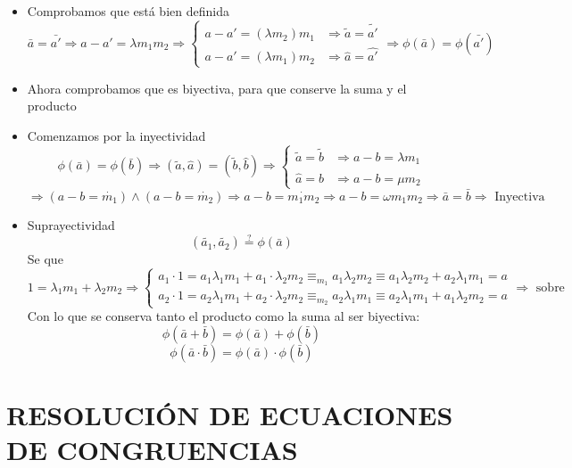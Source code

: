 \documentclass[10pt,a4paper,openright]{book}
\theoremstyle{break}
\begin{document}
\begin{itemize}
\item Comprobamos que está bien definida
$$\bar{a}=\bar{a'}\Rightarrow a-a'=\lambda m_1m_2\Rightarrow
\begin{cases}
a-a'=(\lambda m_2)m_1 & \Rightarrow \tilde{a}=\tilde{a'} \\
a-a'=(\lambda m_1)m_2 & \Rightarrow \hat{a}=\hat{a'}
\end{cases}
\Rightarrow \phi(\bar{a})=\phi(\bar{a'})
$$

\item Ahora comprobamos que es biyectiva, para que conserve la suma y el producto
\item Comenzamos por la inyectividad
$$\phi(\bar{a})=\phi(\bar{b})\Rightarrow (\tilde{a}, \hat{a})=(\tilde{b}, \hat{b})\Rightarrow
\begin{cases}
\tilde{a}=\tilde{b} & \Rightarrow a-b=\lambda m_1 \\
\hat{a}=\hat{b} & \Rightarrow a-b=\mu m_2
\end{cases}
$$
$$
\Rightarrow (a-b=\dot{m_1})\wedge (a-b=\dot{m_2})\Rightarrow a-b=\dot{m_1m_2} \Rightarrow a-b=\omega m_1 m_2 \Rightarrow \bar{a}=\bar{b}\Rightarrow \mbox{ Inyectiva}
$$
\item Suprayectividad
$$(\tilde{a_1},\tilde{a_2})\stackrel{?}{=}\phi(\bar{a})$$
Se que $$1=\lambda_1 m_1+\lambda_2 m_2 \Rightarrow
\begin{cases}
a_1\cdot 1=a_1\lambda_1 m_1+ a_1\cdot \lambda_2 m_2\equiv_{m_1} a_1\lambda_2 m_2\equiv a_1\lambda_2 m_2+a_2\lambda_1 m_1= a\\
a_2\cdot 1=a_2\lambda_1 m_1+ a_2\cdot \lambda_2 m_2\equiv_{m_2} a_2\lambda_1 m_1\equiv a_2\lambda_1 m_1+ a_1\lambda_2 m_2= a 
\end{cases}
\Rightarrow \mbox{ sobre}
$$
Con lo que se conserva tanto el producto como la suma al ser biyectiva:
$$\phi(\bar{a}+\bar{b})=\phi(\bar{a})+\phi(\bar{b})$$
$$\phi(\bar{a}\cdot \bar{b})=\phi(\bar{a})\cdot \phi(\bar{b})$$
\end{itemize}


\section*{RESOLUCIÓN DE ECUACIONES DE CONGRUENCIAS}
\end{document}
